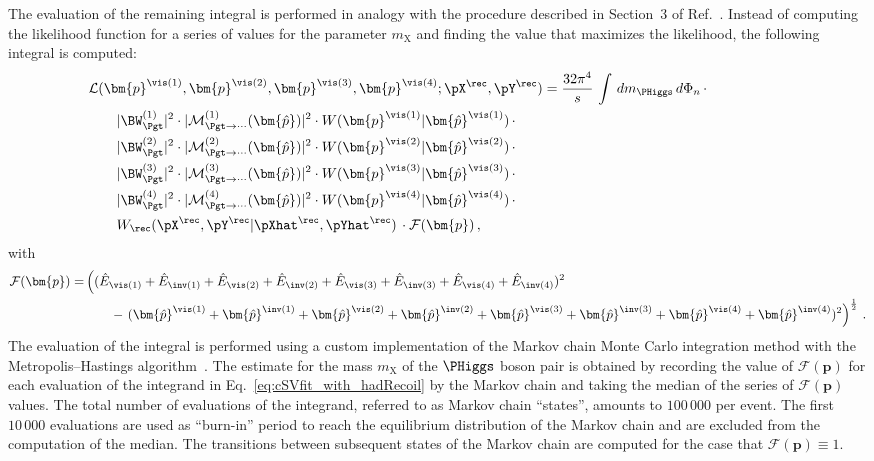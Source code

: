The evaluation of the remaining integral is performed in analogy with the procedure described in Section~3 of Ref.~\cite{SVfitMEM}.
Instead of computing the likelihood function for a series of values for the parameter $m_{\textrm{X}}$ and finding the value that maximizes the likelihood,
the following integral is computed:
\begin{align}
&
\mathcal{L}(\bm{p}^{\vis(1)},\bm{p}^{\vis(2)},\bm{p}^{\vis(3)},\bm{p}^{\vis(4)};\pX^{\rec},\pY^{\rec})
= \frac{32\pi^{4}}{s} \, \int \, dm_{\PHiggs} \, d\Phi_{n} \, \cdot \hspace{2cm} \nonumber \\
& \qquad \vert \BW^{(1)}_{\Pgt} \vert^{2} \cdot \vert \mathcal{M}^{(1)}_{\Pgt\to\cdots}(\bm{\hat{p}}) \vert^{2} \cdot W(\bm{p}^{\vis(1)}|\bm{\hat{p}}^{\vis(1)}) \, \cdot \nonumber \\
& \qquad \vert \BW^{(2)}_{\Pgt} \vert^{2} \cdot \vert \mathcal{M}^{(2)}_{\Pgt\to\cdots}(\bm{\hat{p}}) \vert^{2} \cdot W(\bm{p}^{\vis(2)}|\bm{\hat{p}}^{\vis(2)}) \, \cdot \nonumber \\
& \qquad \vert \BW^{(3)}_{\Pgt} \vert^{2} \cdot \vert \mathcal{M}^{(3)}_{\Pgt\to\cdots}(\bm{\hat{p}}) \vert^{2} \cdot W(\bm{p}^{\vis(3)}|\bm{\hat{p}}^{\vis(3)}) \, \cdot \nonumber \\
& \qquad \vert \BW^{(4)}_{\Pgt} \vert^{2} \cdot \vert \mathcal{M}^{(4)}_{\Pgt\to\cdots}(\bm{\hat{p}}) \vert^{2} \cdot W(\bm{p}^{\vis(4)}|\bm{\hat{p}}^{\vis(4)}) \, \cdot \nonumber \\
& \qquad W_{\rec}( \pX^{\rec},\pY^{\rec} | \pXhat^{\rec},\pYhat^{\rec} ) \, \cdot \mathcal{F}(\bm{p}) \, ,
\label{eq:cSVfit_with_hadRecoil}
\end{align}
with 
\begin{align}
\mathcal{F}(\bm{p}) = & \left( (\hat{E}_{\vis(1)} + \hat{E}_{\inv(1)} + \hat{E}_{\vis(2)} + \hat{E}_{\inv(2)} + \hat{E}_{\vis(3)} + \hat{E}_{\inv(3)} + \hat{E}_{\vis(4)} + \hat{E}_{\inv(4)})^{2} \right. \nonumber \\
& \qquad - \left. (\bm{\hat{p}}^{\vis(1)} + \bm{\hat{p}}^{\inv(1)} + \bm{\hat{p}}^{\vis(2)} + \bm{\hat{p}}^{\inv(2)} + \bm{\hat{p}}^{\vis(3)} + \bm{\hat{p}}^{\inv(3)} + \bm{\hat{p}}^{\vis(4)} + \bm{\hat{p}}^{\inv(4)})^{2} \right)^{\frac{1}{2}} \, .
\end{align}
The evaluation of the integral is performed using a custom implementation of the Markov chain Monte Carlo integration method 
with the Metropolis--Hastings algorithm~\cite{Metropolis_Hastings}.
The estimate for the mass $m_{\textrm{X}}$ of the $\PHiggs$ boson pair is obtained by recording the value of $\mathcal{F}(\bm{p})$
for each evaluation of the integrand in Eq.~\ref{eq:cSVfit_with_hadRecoil} by the Markov chain and taking the median of the series of $\mathcal{F}(\bm{p})$ values.
The total number of evaluations of the integrand, referred to as Markov chain ``states'', amounts to $100\,000$ per event. 
The first $10\,000$ evaluations are used as ``burn-in'' period to reach the equilibrium distribution of the Markov chain and are excluded from the computation of the median.
The transitions between subsequent states of the Markov chain are computed for the case that $\mathcal{F}(\bm{p}) \equiv 1$.

